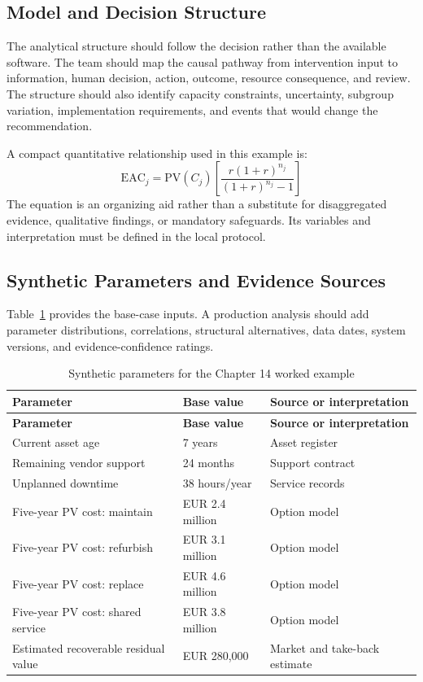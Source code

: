 \subsection{Model and Decision Structure}
The analytical structure should follow the decision rather than the available
software. The team should map the causal pathway from intervention input to
information, human decision, action, outcome, resource consequence, and review.
The structure should also identify capacity constraints, uncertainty, subgroup
variation, implementation requirements, and events that would change the
recommendation.

A compact quantitative relationship used in this example is:
\begin{equation}
\mathrm{EAC}_j=\mathrm{PV}(C_j)\left[\frac{r(1+r)^{n_j}}{(1+r)^{n_j}-1}\right]
\label{eq:comp-ch14-key-relationship}
\end{equation}
The equation is an organizing aid rather than a substitute for disaggregated evidence,
qualitative findings, or mandatory safeguards. Its variables and interpretation must
be defined in the local protocol.

\subsection{Synthetic Parameters and Evidence Sources}
Table~\ref{tab:comp-ch14-parameters} provides the base-case inputs. A
production analysis should add parameter distributions, correlations, structural
alternatives, data dates, system versions, and evidence-confidence ratings.

\begin{longtable}{@{}p{}p{}p{}@{}}
\caption{Synthetic parameters for the Chapter 14 worked example}
\label{tab:comp-ch14-parameters}\\
\toprule
\textbf{Parameter} & \textbf{Base value} & \textbf{Source or interpretation} \\
\midrule
\endfirsthead
\toprule
\textbf{Parameter} & \textbf{Base value} & \textbf{Source or interpretation} \\
\midrule
\endhead
\bottomrule
\endlastfoot
Current asset age & 7 years & Asset register \\
Remaining vendor support & 24 months & Support contract \\
Unplanned downtime & 38 hours/year & Service records \\
Five-year PV cost: maintain & EUR 2.4 million & Option model \\
Five-year PV cost: refurbish & EUR 3.1 million & Option model \\
Five-year PV cost: replace & EUR 4.6 million & Option model \\
Five-year PV cost: shared service & EUR 3.8 million & Option model \\
Estimated recoverable residual value & EUR 280,000 & Market and take-back estimate \\
\end{longtable}

